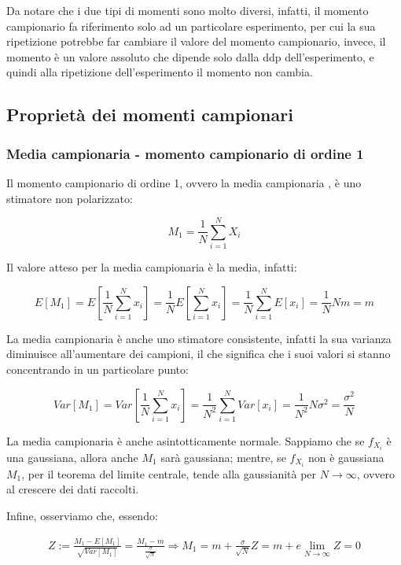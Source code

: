 Da notare che i due tipi di momenti sono molto diversi, infatti, il momento campionario fa riferimento solo ad un particolare esperimento, per cui la sua ripetizione potrebbe far cambiare il valore del momento campionario, invece, il momento è un valore assoluto che dipende solo dalla ddp dell'esperimento, e quindi alla ripetizione dell'esperimento il momento non cambia.
\subsection{Proprietà dei momenti campionari}
\subsubsection{Media campionaria - momento campionario di ordine 1}%
Il momento campionario di ordine 1, ovvero la media campionaria , è uno stimatore non polarizzato:

    \[ M_1=\frac{1}{N} \sum_{i=1}^{N} X_i \]

Il valore atteso per la media campionaria è la media, infatti:

    \[ E[M_1]=E\left[\frac{1}{N}\sum_{i=1}^{N}{x_i}\right]=\frac{1}{N}E\left[\sum_{i=1}^{N}{x_i}\right]=\frac{1}{N}\sum_{i=1}^{N}{E[x_i]}=\frac{1}{N}Nm=m \]

La media campionaria è anche uno stimatore consistente, infatti la sua varianza diminuisce all'aumentare dei campioni, il che significa che i suoi valori si stanno concentrando in un particolare punto:

    \[ Var[M_1]=Var\left[\frac{1}{N}\sum_{i=1}^{N}{x_i}\right]=\frac{1}{N^2}\sum_{i=1}^{N}{Var[x_i]}=\frac{1}{N^2}N\sigma^2=\frac{\sigma^2}{N} \]

La media campionaria è anche asintotticamente normale. Sappiamo che se $f_{X_i}$ è una gaussiana, allora anche $M_1$ sarà gaussiana; mentre, se $f_{X_i}$ non è gaussiana $M_1$, per il teorema del limite centrale, tende alla gaussianità per $N\rightarrow\infty$, ovvero al crescere dei dati raccolti.\newline

Infine, osserviamo che, essendo:

  \begin{gather*}
    Z:=\frac{M_1-E[M_1]}{\sqrt{Var[M_1]}}=\frac{M_1-m}{\frac{\sigma}{\sqrt{N}}} \Rightarrow M_1=m+\frac{\sigma}{\sqrt{N}}Z = m+e
    \lim_{N \rightarrow \infty}{Z}=0 
  \end{gather*}
  
